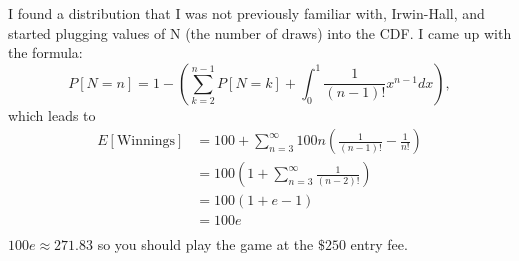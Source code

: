 \documentclass{article}
\begin{document}
\noindent I found a distribution that I was not previously familiar with, Irwin-Hall, and started plugging values of N (the number of draws) into the CDF. I came up with the formula:
    \begin{equation*}P[N=n] = 1 - \left(\sum\limits_{k=2}^{n-1}P[N=k]+\int_{0}^{1}\frac{1}{\left(n-1\right)!}x^{n-1}dx\right),\end{equation*}
which leads to
\begin{equation*}
    \begin{split}
        E[\text{Winnings}]&=100+\sum\limits_{n=3}^{\infty}100n\left(\frac{1}{\left(n-1\right)!}-\frac{1}{n!}\right)\\
                          &=100\left(1+\sum\limits_{n=3}^{\infty}\frac{1}{\left(n-2\right)!}\right)\\
                          &=100\left(1+e-1\right)\\
                          &=100e\\
    \end{split}
\end{equation*}
$100e\approx271.83$ so you should play the game at the $\$250$ entry fee.
\end{document}
